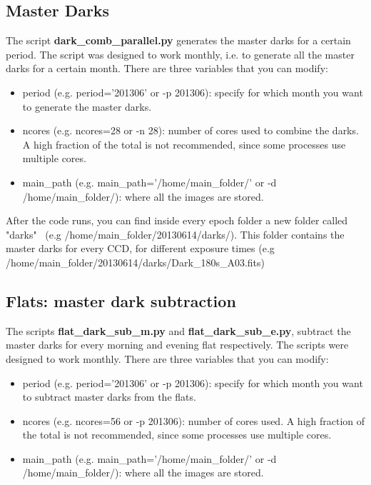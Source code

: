 \documentclass[letter, 12pt]{article}
\begin{document}
\subsection{Master Darks}

The script \textbf{dark\_comb\_parallel.py} generates the master darks for a certain period. The script was designed to work monthly, i.e. to generate all the master darks  for a certain month.  There are three variables that you can modify:

\begin{itemize}

\item period (e.g. period='201306' or -p 201306): specify for which month you want to generate the master darks.

\item ncores (e.g. ncores=28 or -n 28): number of cores used to combine the darks. A high fraction of the total is not recommended, since some processes use multiple cores. 

\item main\_path (e.g. main\_path='/home/main\_folder/' or -d /home/main\_folder/): where all the images are stored.

\end{itemize}

After the code runs, you can find inside every epoch folder a new folder called "darks"  
\ (e.g /home/main\_folder/20130614/darks/). This folder contains the master darks for every CCD, for different exposure times (e.g /home/main\_folder/20130614/darks/Dark\_180s\_A03.fits)



\subsection{Flats: master dark subtraction}

The scripts \textbf{flat\_dark\_sub\_m.py} and \textbf{flat\_dark\_sub\_e.py}, subtract the master darks for every morning and evening flat respectively. The scripts were designed to work monthly. There are three variables that you can modify:

\begin{itemize}

\item period (e.g. period='201306' or -p 201306): specify for which month you want to subtract master darks from the flats.

\item ncores (e.g. ncores=56  or -p 201306): number of cores used. A high fraction of the total is not recommended, since some processes use multiple cores. 

\item main\_path (e.g. main\_path='/home/main\_folder/' or -d /home/main\_folder/): where all the images are stored.

\end{itemize}
\end{document}

